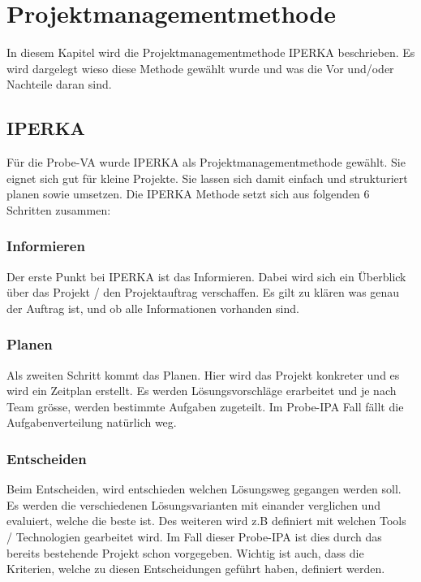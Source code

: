 
\chapter{Projektmanagementmethode}\label{ch:projektmanagementmethode}

In diesem Kapitel wird die Projektmanagementmethode IPERKA beschrieben. Es wird dargelegt wieso diese Methode gewählt wurde und was die Vor und/oder Nachteile daran sind.

\section{IPERKA}\label{sec:iperka}

Für die Probe-VA wurde IPERKA als Projektmanagementmethode gewählt. Sie eignet sich gut für kleine Projekte. Sie lassen sich damit einfach und strukturiert planen sowie umsetzen. 
Die IPERKA Methode setzt sich aus folgenden 6 Schritten zusammen:

\subsection{Informieren}
Der erste Punkt bei IPERKA ist das Informieren. Dabei wird sich ein Überblick über das Projekt / den Projektauftrag verschaffen. Es gilt zu klären was genau der Auftrag ist, und ob alle Informationen vorhanden sind.

\subsection{Planen}
Als zweiten Schritt kommt das Planen. Hier wird das Projekt konkreter und es wird ein Zeitplan erstellt. Es werden Lösungsvorschläge erarbeitet und je nach Team grösse, werden bestimmte Aufgaben zugeteilt. Im Probe-IPA Fall fällt die Aufgabenverteilung natürlich weg. 

\subsection{Entscheiden}
Beim Entscheiden, wird entschieden welchen Lösungsweg gegangen werden soll. Es werden die verschiedenen Lösungsvarianten mit einander verglichen und evaluiert, welche die beste ist. Des weiteren wird z.B definiert mit welchen Tools / Technologien gearbeitet wird. Im Fall dieser Probe-IPA ist dies durch das bereits bestehende Projekt schon vorgegeben. Wichtig ist auch, dass die Kriterien, welche zu diesen Entscheidungen geführt haben, definiert werden.

